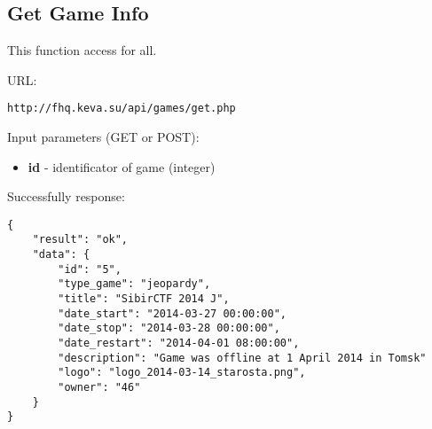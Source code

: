 \subsection{Get Game Info}
\par

This function access for all.

URL:
\begin{Verbatim}[frame=single]
http://fhq.keva.su/api/games/get.php
\end{Verbatim}

Input parameters (GET or POST):
\begin{itemize}
  \item \textbf{id} - identificator of game (integer)
\end{itemize}

Successfully response:  \\
\begin{Verbatim}[frame=single]
{
    "result": "ok",
    "data": {
        "id": "5",
        "type_game": "jeopardy",
        "title": "SibirCTF 2014 J",
        "date_start": "2014-03-27 00:00:00",
        "date_stop": "2014-03-28 00:00:00",
        "date_restart": "2014-04-01 08:00:00",
        "description": "Game was offline at 1 April 2014 in Tomsk"
        "logo": "logo_2014-03-14_starosta.png",
        "owner": "46"
    }
}
\end{Verbatim}

~
